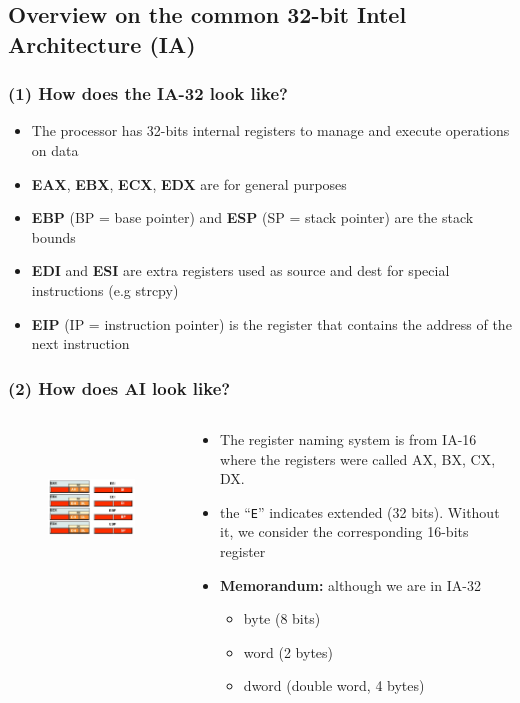 \documentclass[]{beamer}
\begin{document}
\subsection{Overview on the common 32-bit Intel Architecture (IA)}
\begin{frame}
  \frametitle{(1) How does the IA-32 look like?}
  \begin{itemize}
  \item{The processor has 32-bits internal registers to manage and execute operations on data}
  \item{{\bf EAX}, {\bf EBX}, {\bf ECX}, {\bf EDX} are for general purposes}
  \item{{\bf EBP} (BP = base pointer) and {\bf ESP} (SP = stack pointer) are the stack bounds}
  \item{{\bf EDI} and {\bf ESI} are extra registers used as source and dest for special instructions (e.g strcpy)}
  \item{{\bf EIP} (IP = instruction pointer) is the register that contains the address of the next instruction}
  \end{itemize}
\end{frame}
\begin{frame}
  \frametitle{(2) How does AI look like?}
  \begin{columns}
    \begin{column}{2.5in}
      \begin{figure}
        \includegraphics[height=1.6in]{images/registers.jpeg}
        \label{Registers Division}
      \end{figure}
    \end{column}
    \begin{column}{2.5in}
      \begin{itemize}
      \item The register naming system is from IA-16 where the
        registers were called AX, BX, CX, DX.
      \item the ``\texttt{E}'' indicates extended (32 bits). Without
        it, we consider the corresponding 16-bits register
      \item \textbf{Memorandum:} although we are in IA-32
        \begin{itemize}
        \item byte (8 bits)
        \item word (2 bytes)
        \item dword (double word, 4 bytes)
        \end{itemize}
      \end{itemize}
    \end{column}
  \end{columns}
\end{frame}
\end{document}
